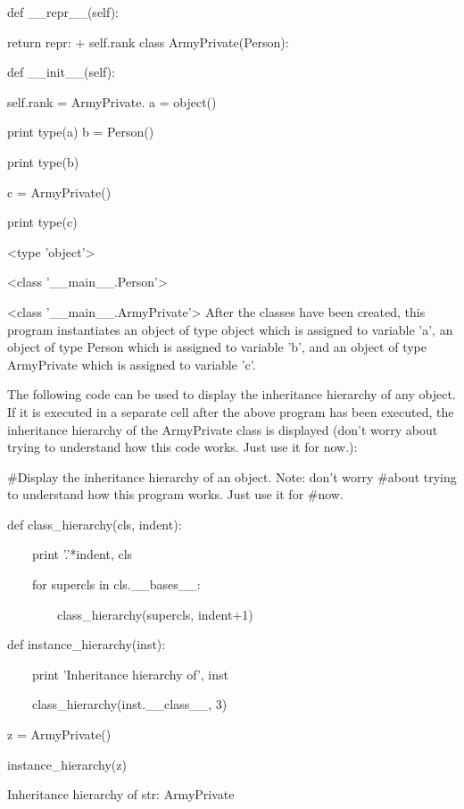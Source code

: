 \documentclass[12pt,oneside]{book}
\begin{document}
  

 def \_\_repr\_\_(self):

  return {\textquotedbl}repr: {\textquotedbl} + self.rank
class ArmyPrivate(Person):

 def \_\_init\_\_(self):

  self.rank = {\textquotedbl}ArmyPrivate.{\textquotedbl}
a = object()

print type(a)
b = Person()

print type(b)


c = ArmyPrivate()

print type(c)

{\textbar}

{\textless}type 'object'{\textgreater}

{\textless}class '\_\_main\_\_.Person'{\textgreater}

{\textless}class '\_\_main\_\_.ArmyPrivate'{\textgreater}
After the classes have been created, this program instantiates an object of type object which is assigned to variable 'a', an object of type Person which is assigned to variable 'b', and an object of type ArmyPrivate which is assigned to variable 'c'. 

The following code can be used to display the inheritance hierarchy of any object. If it is executed in a separate cell after the above program has been executed, the inheritance hierarchy of the ArmyPrivate class is displayed (don't worry about trying to understand how this code works. Just use it for now.): 

\#Display the inheritance hierarchy of an object. Note: don't worry \#about trying to understand how this program works. Just use it for \#now.

def class\_hierarchy(cls, indent):

\ \ \ \ print '.'*indent, cls

\ \ \ \ for supercls in cls.\_\_bases\_\_:

\ \ \ \ \ \ \ \ class\_hierarchy(supercls, indent+1)


def instance\_hierarchy(inst):

\ \ \ \ print 'Inheritance hierarchy of', inst

\ \ \ \ class\_hierarchy(inst.\_\_class\_\_, 3)


z = ArmyPrivate()


instance\_hierarchy(z)

{\textbar}

Inheritance hierarchy of str: ArmyPrivate
\end{document}
